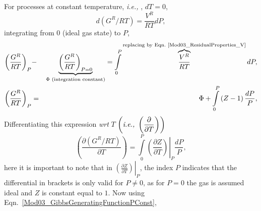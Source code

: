 \documentclass[12pts,a4paper,amsmath,amssymb,floatfix]{article}%
\newcommand{\frc}{\displaystyle\frac}
\newcommand{\ie}{{\it i.e., }}
\newcommand{\wrt}{{\it wrt }}
\newcommand{\Partial}[3][error]{\left(\frc{\partial #1}{\partial #2}\right)_{#3}}
\begin{document}
      For processes at constant temperature, \ie, $dT=0$,
          \begin{displaymath}
              d\left(G^{R}/RT\right) = \frc{V^{R}}{RT}dP,
          \end{displaymath}
          integrating from $0$ (ideal gas state) to $P$,
          \begin{eqnarray}
              \left(\frc{G^{R}}{RT}\right)_{P} &-&  \underbrace{\left(\frc{G^{R}}{RT}\right)_{P=0}}_{\Phi \text{ (integration constant)}} =  \int\limits_{0}^{P}\overbrace{\frc{V^{R}}{RT}}^{\text{replacing by Eqn.~\ref{Mod03_ResidualProperties_V}}}dP, \nonumber \\
              \left(\frc{G^{R}}{RT}\right)_{P} &=& \Phi + \int\limits_{0}^{P}\left(Z-1\right)\frc{dP}{P},\label{Mod03_ResidualProperties_GeneratingGibbsFunction2}
          \end{eqnarray}
          Differentiating this expression \wrt $T$ $\left(\text{\ie }\Partial[]{T}{}\right)$ 
          \begin{displaymath}
              \Partial[\left(G^{R}/RT\right)]{T}{} = \int\limits_{0}^{P} \left.\Partial[Z]{T}{}\right|_{P}\frc{dP}{P},
          \end{displaymath}
          here it is important to note that in $\left.\Partial[Z]{T}{}\right|_{P}$, the index $P$ indicates that the differential in brackets is only valid for $P\ne0$, as for $P=0$ the gas is assumed ideal and $Z$ is constant equal to $1$. Now using Eqn.~\ref{Mod03_GibbsGeneratingFunctionPConst},
\end{document}
